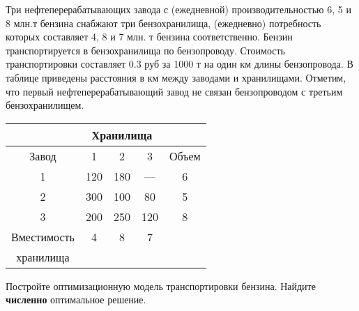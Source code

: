 \begin{exercise}
Три нефтеперерабатывающих завода с (ежедневной) производительностью
6, 5 и 8 млн.т бензина снабжают три бензохранилища, (ежедневно)
потребность которых составляет  4, 8 и 7 млн. т бензина соответственно.
Бензин транспортируется в бензохранилища по бензопроводу. Стоимость
транспортировки составляет 0.3 руб за 1000 т на один км длины бензопровода.
В таблице приведены расстояния в км между заводами и хранилищами.
Отметим, что первый нефтеперерабатывающий завод не связан бензопроводом
с третьим бензохранилищем.
\begin{center}%
	\begin{tabular}{|c|c|c|c|c|} \hline
	& \multicolumn{3}{|c|}{Хранилища} & \\ \hline
 	Завод & 1 & 2 & 3 & Объем \\ \hline
 	1 & 120 & 180 & --- & 6 \\ \hline
	2 & 300 & 100 & 80 & 5 \\ \hline
	3 & 200 & 250 & 120 & 8 \\ \hline
	Вместимость & 4& 8 & 7 & \\ %
	хранилища & & & & \\ \hline
	\end{tabular}
\end{center}
Постройте оптимизационную модель транспортировки бензина.
Найдите \textbf{численно} оптимальное решение.
\end{exercise}